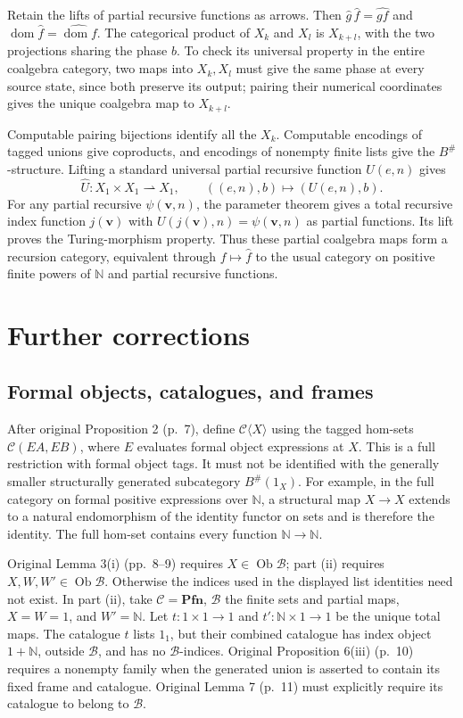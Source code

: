 \documentclass[11pt]{article}
\newcommand{\C}{\mathcal C}\newcommand{\D}{\mathcal D}\newcommand{\B}{\mathcal B}
\newcommand{\dom}{\operatorname{dom}}\newcommand{\ran}{\operatorname{ran}}
\begin{document}
Retain the lifts of partial recursive functions as arrows. Then
$\widehat g\,\widehat f=\widehat{gf}$ and
$\dom\widehat f=\widehat{\dom f}$. The categorical product of $X_k$ and $X_l$ is $X_{k+l}$, with the two projections sharing the phase $b$. To check its universal property in the entire coalgebra category, two maps into $X_k,X_l$ must give the same phase at every source state, since both preserve its output; pairing their numerical coordinates gives the unique coalgebra map to $X_{k+l}$.

Computable pairing bijections identify all the $X_k$. Computable encodings of tagged unions give coproducts, and encodings of nonempty finite lists give the $B^\#$-structure. Lifting a standard universal partial recursive function $U(e,n)$ gives
\[
\widehat U:X_1\times X_1\rightharpoonup X_1,
\qquad ((e,n),b)\longmapsto(U(e,n),b).
\]
For any partial recursive $\psi(\mathbf v,n)$, the parameter theorem gives a total recursive index function $j(\mathbf v)$ with $U(j(\mathbf v),n)=\psi(\mathbf v,n)$ as partial functions. Its lift proves the Turing-morphism property. Thus these partial coalgebra maps form a recursion category, equivalent through $f\mapsto\widehat f$ to the usual category on positive finite powers of $\mathbb N$ and partial recursive functions.

\section{Further corrections}\label{sec:other-corrections}

\subsection{Formal objects, catalogues, and frames}
After original Proposition 2 (p.~7), define $\C\langle X\rangle$ using the tagged hom-sets $\C(EA,EB)$, where $E$ evaluates formal object expressions at $X$. This is a full restriction with formal object tags. It must not be identified with the generally smaller structurally generated subcategory $B^\#(1_X)$. For example, in the full category on formal positive expressions over $\mathbb N$, a structural map $X\to X$ extends to a natural endomorphism of the identity functor on sets and is therefore the identity. The full hom-set contains every function $\mathbb N\to\mathbb N$.

Original Lemma 3(i) (pp.~8--9) requires $X\in\operatorname{Ob}\B$; part (ii) requires $X,W,W'\in\operatorname{Ob}\B$. Otherwise the indices used in the displayed list identities need not exist. In part (ii), take $\C=\mathbf{Pfn}$, $\B$ the finite sets and partial maps, $X=W=1$, and $W'=\mathbb N$. Let $t:1\times1\to1$ and $t':\mathbb N\times1\to1$ be the unique total maps. The catalogue $t$ lists $1_1$, but their combined catalogue has index object $1+\mathbb N$, outside $\B$, and has no $\B$-indices. Original Proposition 6(iii) (p.~10) requires a nonempty family when the generated union is asserted to contain its fixed frame and catalogue. Original Lemma 7 (p.~11) must explicitly require its catalogue to belong to $\B$.
\end{document}
